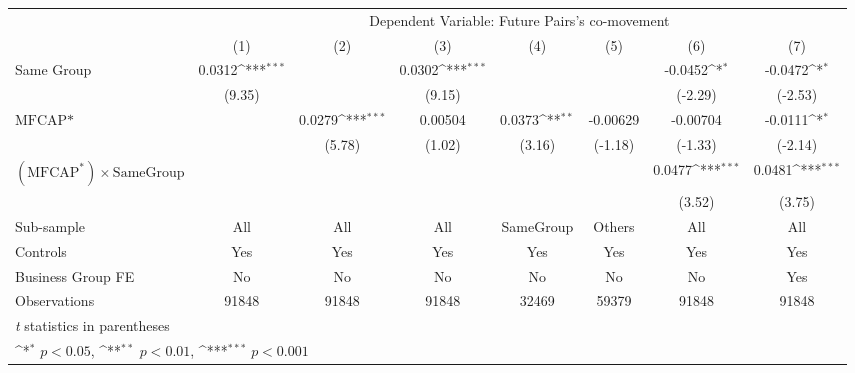 {
\def\sym#1{\ifmmode^{#1}\else\(^{#1}\)\fi}
\begin{tabular}{l*{7}{c}}
\hline\hline
                &\multicolumn{7}{c}{Dependent Variable:  Future Pairs's co-movement}                                                                 \\\cmidrule(lr){2-8}
                &\multicolumn{1}{c}{(1)}         &\multicolumn{1}{c}{(2)}         &\multicolumn{1}{c}{(3)}         &\multicolumn{1}{c}{(4)}         &\multicolumn{1}{c}{(5)}         &\multicolumn{1}{c}{(6)}         &\multicolumn{1}{c}{(7)}         \\
\hline
Same Group      &   0.0312\sym{***}&                  &   0.0302\sym{***}&                  &                  &  -0.0452\sym{*}  &  -0.0472\sym{*}  \\
                &   (9.35)         &                  &   (9.15)         &                  &                  &  (-2.29)         &  (-2.53)         \\
[1em]
$ \text{MFCAP*} $&                  &   0.0279\sym{***}&  0.00504         &   0.0373\sym{**} & -0.00629         & -0.00704         &  -0.0111\sym{*}  \\
                &                  &   (5.78)         &   (1.02)         &   (3.16)         &  (-1.18)         &  (-1.33)         &  (-2.14)         \\
[1em]
 $ (\text{MFCAP}^*) \times {\text{SameGroup} }  $ &                  &                  &                  &                  &                  &   0.0477\sym{***}&   0.0481\sym{***}\\
                &                  &                  &                  &                  &                  &   (3.52)         &   (3.75)         \\
\hline
Sub-sample      &      All         &      All         &      All         &SameGroup         &   Others         &      All         &      All         \\
Controls        &      Yes         &      Yes         &      Yes         &      Yes         &      Yes         &      Yes         &      Yes         \\
Business Group FE&       No         &       No         &       No         &       No         &       No         &       No         &      Yes         \\
Observations    &    91848         &    91848         &    91848         &    32469         &    59379         &    91848         &    91848         \\
\hline\hline
\multicolumn{8}{l}{\footnotesize \textit{t} statistics in parentheses}\\
\multicolumn{8}{l}{\footnotesize \sym{*} \(p<0.05\), \sym{**} \(p<0.01\), \sym{***} \(p<0.001\)}\\
\end{tabular}
}
